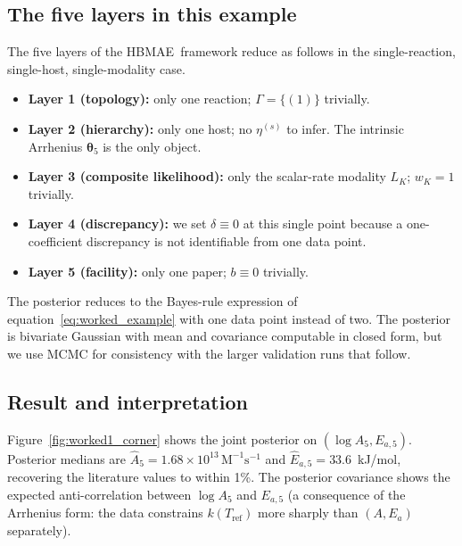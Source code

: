 \documentclass[12pt]{article}
\theoremstyle{plain}
\theoremstyle{definition}
\theoremstyle{remark}
\newcommand{\HBMAE}{HBMAE\xspace}
\begin{document}
\subsection{The five layers in this example}

The five layers of the \HBMAE\ framework reduce as follows in the
single-reaction, single-host, single-modality case.

\begin{itemize}
\item \textbf{Layer 1 (topology):} only one reaction; $\Gamma = \{(1)\}$
trivially.
\item \textbf{Layer 2 (hierarchy):} only one host; no $\eta^{(s)}$ to
infer.  The intrinsic Arrhenius $\boldsymbol\theta_5$ is the only object.
\item \textbf{Layer 3 (composite likelihood):} only the scalar-rate
modality $L_K$; $w_K = 1$ trivially.
\item \textbf{Layer 4 (discrepancy):} we set $\delta\equiv 0$ at this
single point because a one-coefficient discrepancy is not identifiable from
one data point.
\item \textbf{Layer 5 (facility):} only one paper; $b\equiv 0$ trivially.
\end{itemize}

The posterior reduces to the Bayes-rule expression of
equation~\eqref{eq:worked_example} with one data point instead of two.
The posterior is bivariate Gaussian with mean and covariance computable in
closed form, but we use MCMC for consistency with the larger validation
runs that follow.

\subsection{Result and interpretation}\label{sec:worked1:result}

Figure~\ref{fig:worked1_corner} shows the joint posterior on
$(\log A_5, E_{a,5})$.  Posterior medians are
$\hat A_5 = 1.68\times 10^{13}\,\mathrm{M}^{-1}\mathrm{s}^{-1}$ and
$\hat E_{a,5} = 33.6$~kJ/mol, recovering the literature values to within
1\%.  The posterior covariance shows the expected anti-correlation between
$\log A_5$ and $E_{a,5}$ (a consequence of the Arrhenius form: the data
constrains $k(T_{\mathrm{ref}})$ more sharply than $(A, E_a)$ separately).
\end{document}
